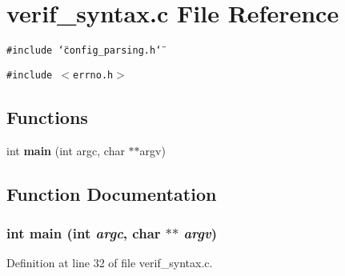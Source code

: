 \section{verif\_\-syntax.c File Reference}
\label{verif__syntax_8c}
{\tt \#include \char`\"{}config\_\-parsing.h\char`\"{}}\par
{\tt \#include $<$errno.h$>$}\par
\subsection*{Functions}
\begin{CompactItemize}
\item 
int {\bf main} (int argc, char $\ast$$\ast$argv)
\end{CompactItemize}


\subsection{Function Documentation}
\subsubsection[{main}]{\setlength{\rightskip}{0pt plus 5cm}int main (int {\em argc}, \/  char $\ast$$\ast$ {\em argv})}\label{verif__syntax_8c_3c04138a5bfe5d72780bb7e82a18e627}




Definition at line 32 of file verif\_\-syntax.c.